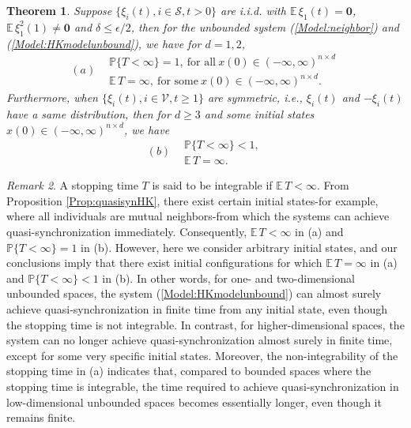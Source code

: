 \documentclass[11pt]{article}
\newtheorem{thm}{Theorem}[section]
\theoremstyle{definition}
\theoremstyle{remark}
\newtheorem{rem}[thm]{Remark}
\numberwithin{equation}{section}
\begin{document}
\begin{thm}\label{Thm:mainunbounded}
Suppose $\{\xi_i(t), i\in\mathcal{S}, t>0\}$ are i.i.d. with $\mathbb{E}\,\xi_1(t)=\textbf{0}$, $\mathbb{E}\, \xi_1^2(1)\neq\textbf{0}$ and $\delta\leq\epsilon/2$, then for the unbounded system (\ref{Model:neighbor}) and (\ref{Model:HKmodelunbound}), we have for $d=1,2$,
\begin{equation*}
 (a)\begin{split}
 &\mathbb{P}\{T<\infty\}=1, ~\text{for all}~x(0)\in (-\infty, \infty)^{n\times d}\\
 &\mathbb{E}\,T=\infty,~\text{for some}~x(0)\in (-\infty, \infty)^{n\times d}.
 \end{split}
\end{equation*}
Furthermore, when $\{\xi_i(t), i\in\mathcal{V}, t\geq 1\}$ are symmetric, i.e., $\xi_i(t)$ and $-\xi_i(t)$ have a same distribution, then for $d\geq 3$ and some initial states $x(0)\in (-\infty, \infty)^{n\times d}$, we have
\begin{equation*}
 (b)\begin{split}
 &\mathbb{P}\{T<\infty\}<1, \\
 &\mathbb{E}\,T=\infty.
\end{split}
\end{equation*}
\end{thm}
\begin{rem}
A stopping time $T$ is said to be integrable if $\mathbb{E}\,T<\infty$. From Proposition \ref{Prop:quasisynHK}, there exist certain initial states-for example, where all individuals are mutual neighbors-from which the systems can achieve quasi-synchronization immediately. Consequently, $\mathbb{E}\,T<\infty$ in (a) and $\mathbb{P}\{T<\infty\}=1$ in (b). However, here we consider arbitrary initial states, and our conclusions imply that there exist initial configurations for which $\mathbb{E}\,T=\infty$ in (a) and $\mathbb{P}\{T<\infty\}<1$ in (b). In other words, for one- and two-dimensional unbounded spaces, the system (\ref{Model:HKmodelunbound}) can almost surely achieve quasi-synchronization in finite time from any initial state, even though the stopping time is not integrable. In contrast, for higher-dimensional spaces, the system can no longer achieve quasi-synchronization almost surely in finite time, except for some very specific initial states.
Moreover, the non-integrability of the stopping time in (a) indicates that, compared to bounded spaces where the stopping time is integrable, the time required to achieve quasi-synchronization in low-dimensional unbounded spaces becomes essentially longer, even though it remains finite.
\end{rem}
\end{document}
